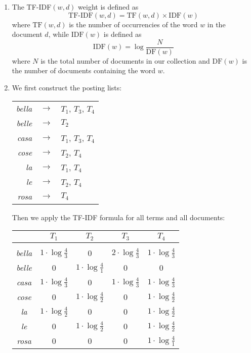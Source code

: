 \begin{enumerate}

  \item The TF-IDF$(w, d)$ weight is defined as $$\text{TF-IDF}(w, d) =
  \text{TF}(w, d) \times \text{IDF}(w)$$ where $\text{TF}(w, d)$ is the number
  of occurrencies of the word $w$ in the document $d$, while $\text{IDF}(w)$ is
  defined as $$\text{IDF}(w) = \log \frac{N}{\text{DF}(w)}$$ where $N$ is the
  total number of documents in our collection and $\text{DF}(w)$ is the number
  of documents containing the word $w$.

  \item We first construct the posting lists:
  \begin{longtable}{rcl}
    \emph{bella} & $\rightarrow$ & $T_1$, $T_3$, $T_4$ \\
    \emph{belle} & $\rightarrow$ & $T_2$ \\
    \emph{casa} & $\rightarrow$ & $T_1$, $T_3$, $T_4$ \\
    \emph{cose} & $\rightarrow$ & $T_2$, $T_4$ \\
    \emph{la} & $\rightarrow$ & $T_1$, $T_4$ \\
    \emph{le} & $\rightarrow$ & $T_2$, $T_4$ \\
    \emph{rosa} & $\rightarrow$ & $T_4$ \\
  \end{longtable}
  Then we apply the TF-IDF formula for all terms and all documents:
  \begin{center}
    \begin{tabular}{c|c|c|c|c|}
                   & $T_1$ & $T_2$ & $T_3$ & $T_4$ \\ \hline &&&&\\[-1em]
      \emph{bella} & $1 \cdot\log\frac{4}{3}$ & 0
                   & $2 \cdot\log\frac{4}{3}$ & $1 \cdot\log\frac{4}{3}$\\[3pt]
      \emph{belle} & 0 & $1 \cdot\log\frac{4}{1}$ & 0 & 0 \\[3pt]
      \emph{casa}  & $1 \cdot\log\frac{4}{3}$ & 0
                   & $1 \cdot\log\frac{4}{3}$ & $1 \cdot\log\frac{4}{3}$ \\[3pt]
      \emph{cose}  & 0 & $1 \cdot\log\frac{4}{2}$
                   & 0 & $1 \cdot\log\frac{4}{2}$ \\[3pt]
      \emph{la}    & $1 \cdot\log\frac{4}{2}$ & 0
                   & 0 & $1 \cdot\log\frac{4}{2}$ \\[3pt]
      \emph{le}    & 0 & $1 \cdot\log\frac{4}{2}$
                   & 0 & $1 \cdot\log\frac{4}{2}$ \\[3pt]
      \emph{rosa}  & 0 & 0 & 0 & $1 \cdot\log\frac{4}{1}$ \\[3pt] \hline
    \end{tabular}
  \end{center}


\end{enumerate}
